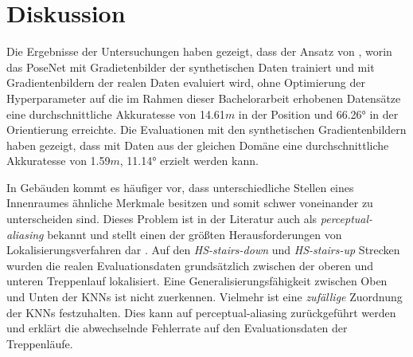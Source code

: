 
\section{Diskussion}
\label{sec:kapitel_5}





Die Ergebnisse der Untersuchungen haben gezeigt, dass der Ansatz von \citet{acharyaBIMPoseNetIndoorCamera2019}, worin das PoseNet mit Gradietenbilder der synthetischen Daten trainiert und mit Gradientenbildern der realen Daten evaluiert wird, ohne Optimierung der Hyperparameter auf die im Rahmen dieser Bachelorarbeit erhobenen Datensätze eine durchschnittliche Akkuratesse von 14.61$m$ in der Position und 66.26° in der Orientierung erreichte. Die Evaluationen mit den synthetischen Gradientenbildern haben gezeigt, dass mit Daten aus der gleichen Domäne eine durchschnittliche Akkuratesse von 1.59$m$, 11.14° erzielt werden kann. 


In Gebäuden kommt es häufiger vor, dass unterschiedliche Stellen eines Innenraumes ähnliche Merkmale besitzen und somit schwer voneinander zu unterscheiden sind. Dieses Problem ist in der Literatur auch als \textit{perceptual-aliasing} bekannt und stellt einen der größten Herausforderungen von Lokalisierungsverfahren dar \cite{lowryVisualPlaceRecognition2016}. Auf den \textit{HS-stairs-down} und \textit{HS-stairs-up} Strecken wurden die realen Evaluationsdaten grundsätzlich zwischen der oberen und unteren Treppenlauf lokalisiert. Eine Generalisierungsfähigkeit zwischen Oben und Unten der KNNs ist nicht zuerkennen. Vielmehr ist eine \textit{zufällige} Zuordnung der KNNs festzuhalten. Dies kann auf perceptual-aliasing zurückgeführt werden und erklärt die abwechselnde Fehlerrate auf den Evaluationsdaten der Treppenläufe.

